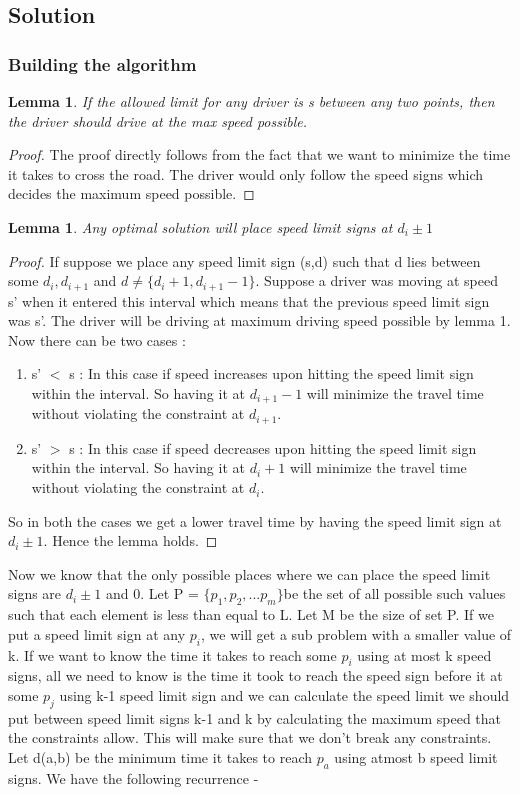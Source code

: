 \documentclass[12pt]{article}
\newtheorem{lemma}[theorem]{Lemma}
\begin{document}
\subsection{Solution}

\subsubsection{Building the algorithm}

\begin{lemma}
If the allowed limit for any driver is s between any two points, then the driver should drive at the max speed possible.
\end{lemma}
\begin{proof}
The proof directly follows from the fact that we want to minimize the time it takes to cross the road. The driver would only follow the speed signs which decides the maximum speed possible.
\end{proof}

\begin{lemma} Any optimal solution will place speed limit signs at $d_i \pm 1$
\end{lemma}
\begin{proof}
If suppose we place any speed limit sign (s,d) such that d lies between some $d_i, d_{i+1}$ and $d\neq \{d_i + 1 ,d_{i+1}-1\} $. Suppose a driver was moving at speed s' when it entered this interval which means that the previous speed limit sign was s'. The driver will be driving at maximum driving speed possible by lemma 1. Now there can be two cases :
\begin{enumerate}
\item s' $<$ s : In this case if speed increases upon hitting the speed limit sign within the interval. So having it at $d_{i+1} - 1$ will minimize the travel time without violating the constraint at $d_{i+1}$.
\item s' $>$ s : In this case if speed decreases upon hitting the speed limit sign within the interval. So having it at $d_{i} + 1$ will minimize the travel time without violating the constraint at $d_{i}$.
\end{enumerate}
So in both the cases we get a lower travel time by having the speed limit sign at $d_i\pm 1$. Hence the lemma holds.
\end{proof}

Now we know that the only possible places where we can place the speed limit signs are $d_i \pm 1$ and 0. Let P  = $\{ p_1,p_2, ... p_m\}$be the set of all possible such values such that each element is less than equal to L. Let M be the size of set P. If we put a speed limit sign at any $p_i$, we will get a sub problem with a smaller value of k. If we want to know the time it takes to reach some $p_i$ using at most k speed signs, all we need to know is the time it took to reach the speed sign before it at some $p_j$ using k-1 speed limit sign and we can calculate the speed limit we should put between speed limit signs k-1 and k by calculating the maximum speed that the constraints allow. This will make sure that we don't break any constraints. Let d(a,b) be the minimum time it takes to reach $p_a$ using atmost b speed limit signs. We have the following recurrence - \\
\end{document}
